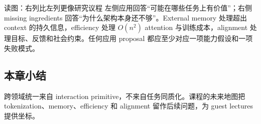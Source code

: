 
\begin{knowledgebox}{读图：右列比左列更像研究议程}
左侧应用回答“可能在哪些任务上有价值”；右侧 missing ingredients 回答“为什么架构本身还不够”。External memory 处理超出 context 的持久信息，efficiency 处理 $O(n^2)$ attention 与训练成本，alignment 处理目标、反馈和社会约束。任何应用 proposal 都应至少对应一项能力假设和一项失败模式。
\end{knowledgebox}


\subsection{本章小结}

跨领域统一来自 interaction primitive，不来自任务同质化。课程的未来地图把 tokenization、memory、efficiency 和 alignment 留作后续问题，为 guest lectures 提供坐标。

